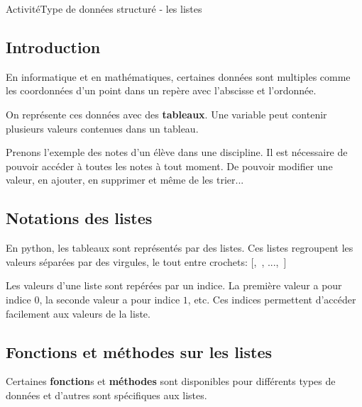 \documentclass[12pt,a4paper]{article}
\newcounter{numexo}
\begin{document}
\begin{NSI}
{Activité}{Type de données structuré - les listes}
\end{NSI}


\subsection*{\Large Introduction}

En informatique et en mathématiques, certaines données sont multiples comme les coordonnées d'un point dans un repère avec l'abscisse et l'ordonnée.\medskip

On représente ces données avec des \textbf{tableaux}. Une variable peut contenir plusieurs valeurs contenues dans un tableau.

Prenons l'exemple des notes d'un élève dans une discipline. Il est nécessaire de pouvoir accéder à toutes les notes à tout moment. De pouvoir modifier une valeur, en ajouter, en supprimer et même de les trier...
\bigskip

\subsection*{Notations des listes}
En python, les tableaux sont représentés par des listes. Ces \textsf{listes} regroupent les valeurs séparées par des virgules, le tout entre crochets:
\textsf{[,~, ...,~]}


Les valeurs d'une liste sont repérées par un \textsf{indice}. La première valeur a pour indice $0$, la seconde valeur a pour indice $1$, etc. Ces indices permettent d'accéder facilement aux valeurs de la liste.

\subsection*{Fonctions et méthodes sur les listes}

Certaines \textbf{fonction}s et \textbf{méthodes} sont disponibles pour différents types de données et d'autres sont spécifiques aux listes.\medskip
\end{document}
